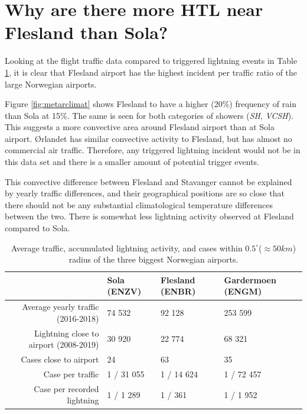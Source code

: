 \section{Why are there more HTL near Flesland than Sola?}

Looking at the flight traffic data compared to triggered lightning events in Table \ref{tab:traffic}, it is clear that Flesland airport has the highest incident per traffic ratio of the large Norwegian airports. 

Figure \ref{fig:metarclimat} shows Flesland to have a higher (20$\%$) frequency of rain than Sola at 15$\%$. The same is seen for both categories of showers (\textit{SH}, \textit{VCSH}). This suggests a more convective area around Flesland airport than at Sola airport. Ørlandet has similar convective activity to Flesland, but has almost no commercial air traffic. Therefore, any triggered lightning incident would not be in this data set and there is a smaller amount of potential trigger events. 

This convective difference between Flesland and Stavanger cannot be explained by yearly traffic differences, and their geographical positions are so close that there should not be any substantial climatological temperature differences between the two. There is somewhat less lightning activity observed at Flesland compared to Sola.

\begin{table}
        \begin{tabular}{r|l|l|l|}
            & Sola (ENZV) & Flesland (ENBR) & Gardermoen (ENGM) \\\hline
            Average yearly traffic (2016-2018)  & 74 532 & 92 128 & 253 599   \\\hline
            Lightning close to airport (2008-2019) & 30 920 & 22 774 & 68 321 \\\hline
            Cases close to airport & 24 & 63  & 35 \\\hline
            Case per traffic  & 1 / 31 055 & 1 / 14 624 & 1 / 72 457 \\\hline
            Case per recorded lightning & 1 / 1 289 & 1 / 361 & 1 / 1 952 \\\hline
        \end{tabular}
     \caption{Average traffic, accumulated lightning activity, and cases within $0.5^{\circ}$($\approx 50km$) radius of the three biggest Norwegian airports.}
     \label{tab:traffic}
\end{table}

